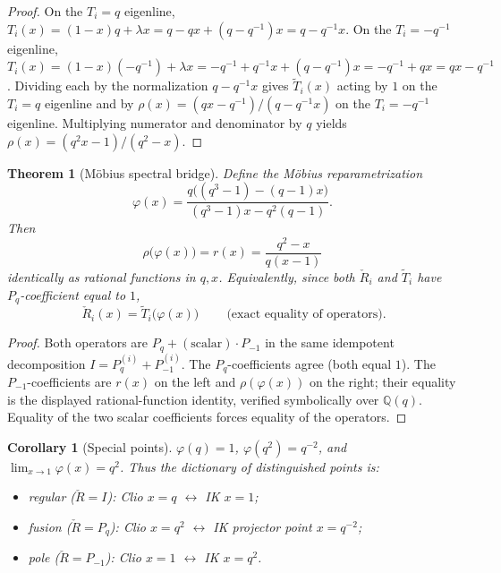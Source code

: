 \documentclass{article}
\newtheorem{theorem}{Theorem}
\newtheorem{corollary}{Corollary}
\theoremstyle{remark}
\newcommand{\Rcheck}{\check{R}}
\newcommand{\Ttilde}{\widetilde{T}}
\begin{document}
\begin{proof}
On the $T_i = q$ eigenline, $T_i(x) = (1-x) q + \lambda x = q - qx + (q - q^{-1})x = q - q^{-1}x$. On the $T_i = -q^{-1}$ eigenline, $T_i(x) = (1-x)(-q^{-1}) + \lambda x = -q^{-1} + q^{-1}x + (q - q^{-1})x = -q^{-1} + qx = qx - q^{-1}$. Dividing each by the normalization $q - q^{-1}x$ gives $\Ttilde_i(x)$ acting by $1$ on the $T_i = q$ eigenline and by $\rho(x) = (qx - q^{-1})/(q - q^{-1}x)$ on the $T_i = -q^{-1}$ eigenline. Multiplying numerator and denominator by $q$ yields $\rho(x) = (q^2 x - 1)/(q^2 - x)$.
\end{proof}

\begin{theorem}[M\"obius spectral bridge]
Define the M\"obius reparametrization
\[
\varphi(x) = \frac{q\big( (q^3 - 1) - (q-1) x \big)}{(q^3 - 1) x - q^2 (q - 1)}.
\]
Then
\[
\rho\big( \varphi(x) \big) = r(x) = \frac{q^2 - x}{q(x-1)}
\]
identically as rational functions in $q, x$. Equivalently, since both $\Rcheck_i$ and $\Ttilde_i$ have $P_q$-coefficient equal to $1$,
\[
\boxed{\ \Rcheck_i(x) = \Ttilde_i\big( \varphi(x) \big)\ }
\qquad \text{(exact equality of operators).}
\]
\end{theorem}

\begin{proof}
Both operators are $P_q + (\text{scalar}) \cdot P_{-1}$ in the same idempotent decomposition $I = P_q^{(i)} + P_{-1}^{(i)}$. The $P_q$-coefficients agree (both equal $1$). The $P_{-1}$-coefficients are $r(x)$ on the left and $\rho(\varphi(x))$ on the right; their equality is the displayed rational-function identity, verified symbolically over $\mathbb{Q}(q)$. Equality of the two scalar coefficients forces equality of the operators.
\end{proof}

\begin{corollary}[Special points]
$\varphi(q) = 1$, $\varphi(q^2) = q^{-2}$, and $\lim_{x \to 1} \varphi(x) = q^2$. Thus the dictionary of distinguished points is:
\begin{itemize}
  \item regular ($\Rcheck = I$): Clio $x = q$ $\leftrightarrow$ IK $x = 1$;
  \item fusion ($\Rcheck = P_q$): Clio $x = q^2$ $\leftrightarrow$ IK projector point $x = q^{-2}$;
  \item pole ($\Rcheck = P_{-1}$): Clio $x = 1$ $\leftrightarrow$ IK $x = q^2$.
\end{itemize}
\end{corollary}
\end{document}
